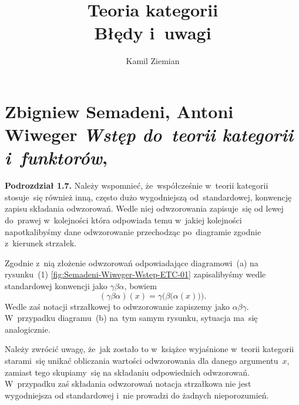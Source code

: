 \documentclass[a4paper,11pt]{article}
\title{Teoria kategorii \\
  {\Large Błędy i~uwagi}}
\author{Kamil Ziemian}
\numberwithin{equation}{section}
\begin{document}





\maketitle





\section{Zbigniew Semadeni, Antoni Wiweger \textit{Wstęp
    do~teorii kategorii i~funktorów},
  \parencite{Semadeni-Wiweger-Wstep-do-teorii-kategorii-ETC-Pub-1972}}

\vspace{0em}



\vspace{0em}


\noindent
\textbf{Podrozdział 1.7.} Należy wspomnieć, że~współcześnie w~teorii
kategorii stosuje~się również inną, często dużo wygodniejszą
od~standardowej, konwencję zapisu składania odwzorowań. Wedle niej
odwzorowania zapisuje~się od lewej do~prawej w~kolejności która odpowiada
temu w~jakiej kolejności napotkalibyśmy dane odwzorowanie przechodząc
po~diagramie zgodnie z~kierunek strzałek.

Zgodnie z~nią złożenie odwzorowań odpowiadające diagramowi~(a) na
rysunku~(1) \eqref{fig:Semadeni-Wiweger-Wstep-ETC-01} zapisalibyśmy wedle
standardowej konwencji jako $\gamma \beta \alpha$, bowiem
\begin{equation}
  \label{eq:Semadeni-Wiweger-Wstep-ETC-01}
  ( \gamma \beta \alpha )( x ) = \gamma\big( \beta\big( \alpha( x ) \big) \big).
\end{equation}
Wedle zaś notacji strzałkowej to odwzorowanie zapiszemy jako $\alpha \beta \gamma$.
W~przypadku diagramu~(b) na~tym samym rysunku, sytuacja ma~się analogicznie.

Należy zwrócić uwagę, że~jak zostało to w~książce wyjaśnione w~teorii
kategorii starami~się unikać obliczania wartości odwzorowania dla danego
argumentu~$x$, zamiast tego skupiamy~się na składaniu odpowiednich
odwzorowań. W~przypadku zaś składania odwzorowań notacja strzałkowa nie jest
wygodniejsza od standardowej i~nie prowadzi do żadnych nieporozumień.
\end{document}
